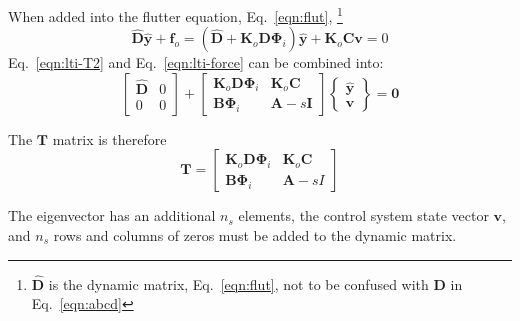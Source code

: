 \documentclass[10pt,openany,twoside]{book}
\numberwithin{equation}{section}   %
\newcommand{\Matrix}[1]{\boldsymbol{#1}}
\newcommand{\Vector}[1]{\boldsymbol{#1}}
\newcommand{\Eqn}[1]{Eq.\ \ref{#1}}
\begin{document}
When added into the flutter equation, \Eqn{eqn:flut},
\footnote{$\hat{\Matrix{D}}$ is the dynamic matrix, \Eqn{eqn:flut}, not to be
confused with $\Matrix{D}$ in \Eqn{eqn:abcd}}
\begin{equation}\label{eqn:lti-force}
\hat{\Matrix{D}}\hat{\Vector{y}} + \Vector{f}_o = \left(\hat{\Matrix{D}} +
		\Matrix{K}_o\Matrix{D\Phi}_i\right)\hat{\Vector{y}}
		+ \Matrix{K}_o\Matrix{Cv} = 0
\end{equation}
\Eqn{eqn:lti-T2} and \Eqn{eqn:lti-force} can be combined into:
\begin{equation}\label{eqn:abcd-combtd}
	\left[ \begin{array}{cc}
		\hat{\Matrix{D}} & 0   \\
			0  &  0
	\end{array} \right] +
	\left[ \begin{array}{cc}
		\Matrix{K}_o\Matrix{D\Phi}_i
		& \Matrix{K}_o\Matrix{C}   \\
		\Matrix{B\Phi}_i  &  \Matrix{A} - s\Matrix{I}
	\end{array} \right]
	\left\{ \begin{array}{c}
		\hat{\Vector{y}} \\
		\Vector{v}
	\end{array} \right\} = \Vector{0}
\end{equation}

The $\Matrix{T}$ matrix is therefore
\begin{equation}
\Matrix{T} = \left[ \begin{array}{cc}
	\Matrix{K}_o\Matrix{D\Phi}_i & \Matrix{K}_o\Matrix{C} \\
	\Matrix{B\Phi}_i  &  \Matrix{A} - sI
\end{array} \right]
\end{equation}

The eigenvector has an additional $n_s$ elements, the control system
state vector $\Vector{v}$, and $n_s$ rows and columns of zeros must
be added to the dynamic matrix.

\end{document}
